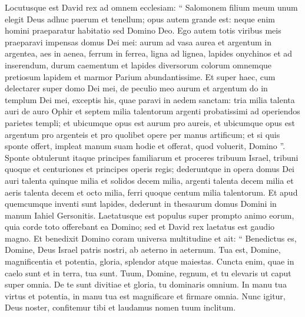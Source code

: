 \begin{biblechapter}
\begin{biblechapter}
\begin{biblechapter}
\begin{biblechapter}
\begin{biblechapter}
\begin{biblechapter}
\begin{biblechapter}
\begin{biblechapter}
\begin{biblechapter}
\begin{biblechapter}
\begin{biblechapter}
\begin{biblechapter}
\begin{biblechapter}
\begin{biblechapter}
\begin{biblechapter}
\begin{biblechapter}
\begin{biblechapter}
\begin{biblechapter}
\begin{biblechapter}
\begin{biblechapter}
\begin{biblechapter}
\begin{biblechapter}
\begin{biblechapter}
\begin{biblechapter}
\begin{biblechapter}
\begin{biblechapter}
\begin{biblechapter}
\begin{biblechapter}
\begin{biblechapter}
\verse Locutusque est David rex ad omnem ecclesiam: “ Salomonem filium meum unum elegit Deus adhuc puerum et tenellum; opus autem grande est: neque enim homini praeparatur habitatio sed Domino Deo. 
\verse Ego autem totis viribus meis praeparavi impensas domus Dei mei: aurum ad vasa aurea et argentum in argentea, aes in aenea, ferrum in ferrea, ligna ad lignea, lapides onychinos et ad inserendum, durum caementum et lapides diversorum colorum omnemque pretiosum lapidem et marmor Parium abundantissime. 
\verse Et super haec, cum delectarer super domo Dei mei, de peculio meo aurum et argentum do in templum Dei mei, exceptis his, quae paravi in aedem sanctam: 
\verse tria milia talenta auri de auro Ophir et septem milia talentorum argenti probatissimi ad operiendos parietes templi; 
\verse et ubicumque opus est aurum pro aureis, et ubicumque opus est argentum pro argenteis et pro quolibet opere per manus artificum; et si quis sponte offert, impleat manum suam hodie et offerat, quod voluerit, Domino ”.
 \verse Sponte obtulerunt itaque principes familiarum et proceres tribuum Israel, tribuni quoque et centuriones et principes operis regis; 
\verse dederuntque in opera domus Dei auri talenta quinque milia et solidos decem milia, argenti talenta decem milia et aeris talenta decem et octo milia, ferri quoque centum milia talentorum. 
\verse Et apud quemcumque inventi sunt lapides, dederunt in thesaurum domus Domini in manum Iahiel Gersonitis. 
\verse Laetatusque est populus super prompto animo eorum, quia corde toto offerebant ea Domino; sed et David rex laetatus est gaudio magno.
 \verse Et benedixit Domino coram universa multitudine et ait:
 “ Benedictus es, Domine, Deus Israel patris nostri,
 ab aeterno in aeternum.
 \verse Tua est, Domine, magnificentia et potentia,
 gloria, splendor atque maiestas.
 Cuncta enim, quae in caelo sunt et in terra, tua sunt.
 Tuum, Domine, regnum, et tu elevaris ut caput super omnia.
 \verse De te sunt divitiae et gloria,
 tu dominaris omnium.
 In manu tua virtus et potentia,
 in manu tua est magnificare et firmare omnia.
 \verse Nunc igitur, Deus noster, confitemur tibi
 et laudamus nomen tuum inclitum. 

\end{biblechapter}
\end{biblechapter}
\end{biblechapter}
\end{biblechapter}
\end{biblechapter}
\end{biblechapter}
\end{biblechapter}
\end{biblechapter}
\end{biblechapter}
\end{biblechapter}
\end{biblechapter}
\end{biblechapter}
\end{biblechapter}
\end{biblechapter}
\end{biblechapter}
\end{biblechapter}
\end{biblechapter}
\end{biblechapter}
\end{biblechapter}
\end{biblechapter}
\end{biblechapter}
\end{biblechapter}
\end{biblechapter}
\end{biblechapter}
\end{biblechapter}
\end{biblechapter}
\end{biblechapter}
\end{biblechapter}
\end{biblechapter}
